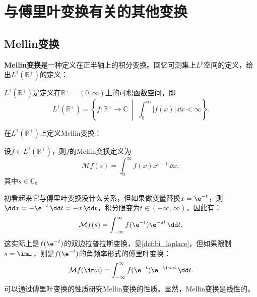 \section{与傅里叶变换有关的其他变换}\label{sec:Other_Transforms}

\subsection{Mellin变换}\label{sub:mellin}

\textbf{Mellin变换}是一种定义在正半轴上的积分变换。回忆可测集上$L^p$空间的定义，给出$L^1(\mathbb{R}^+)$的定义：
\begin{definition}
    $L^1(\mathbb{R}^+)$是定义在$\mathbb{R}^+=(0,\infty)$上的可积函数空间，即
    \begin{equation}
        L^1(\mathbb{R}^+)=\left\{f:\mathbb{R}^+\to\mathbb{C}\;\middle|\;\int_0^{\infty}|f(x)|\,\dd x<\infty\right\}.
    \end{equation}
\end{definition}

在$L^1(\mathbb{R}^+)$上定义Mellin变换：

\begin{definition}[Mellin变换]
    设$f\in L^1(\mathbb{R}^+)$，则$f$的Mellin变换定义为
    \begin{equation}
        \mathcal{M}f(s)=\int_0^{\infty}f(x)x^{s-1}\,\dd x,
    \end{equation}
    其中$s\in\mathbb{C}$。
\end{definition}

初看起来它与傅里叶变换没什么关系，但如果做变量替换$x=\e^{-t}$，则$\dd x=-\e^{-t}\,\dd t=-x\,\dd t$，积分限变为$t\in(-\infty,\infty)$，因此有：
\begin{equation}
    \mathcal{M}f(s)=\int_{-\infty}^{\infty}f(\e^{-t})\e^{-st}\,\dd t.
\end{equation}
这实际上是$f(\e^{-t})$的双边拉普拉斯变换，见\cref{def:bi_laplace}，但如果限制$s=\im\omega$，则是$f(\e^{-t})$的角频率形式的傅里叶变换：
\begin{equation}
    \mathcal{M}f(\im\omega)=\int_{-\infty}^{\infty}f(\e^{-t})\e^{-\im\omega t}\,\dd t.
\end{equation}
可以通过傅里叶变换的性质研究Mellin变换的性质。显然，Mellin变换是线性的。

